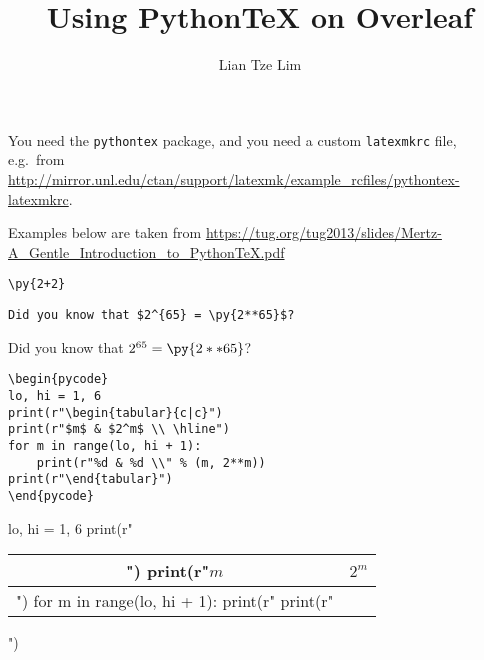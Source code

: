 \documentclass[12pt,a4paper]{scrartcl}
\title{Using PythonTeX on Overleaf}
\author{Lian Tze Lim}
\date{}
\begin{document}
\maketitle

You need the \texttt{pythontex} package, and you need a custom \texttt{latexmkrc} file, e.g.~from \url{http://mirror.unl.edu/ctan/support/latexmk/example_rcfiles/pythontex-latexmkrc}.

Examples below are taken from \url{https://tug.org/tug2013/slides/Mertz-A_Gentle_Introduction_to_PythonTeX.pdf}

\begin{verbatim}
\py{2+2}
\end{verbatim}



\begin{verbatim}
Did you know that $2^{65} = \py{2**65}$?
\end{verbatim}

Did you know that $2^{65} = \py{2**65}$?


\begin{verbatim}
\begin{pycode}
lo, hi = 1, 6
print(r"\begin{tabular}{c|c}")
print(r"$m$ & $2^m$ \\ \hline")
for m in range(lo, hi + 1):
    print(r"%d & %d \\" % (m, 2**m))
print(r"\end{tabular}")
\end{pycode}
\end{verbatim}


\begin{pycode}
lo, hi = 1, 6
print(r"\begin{tabular}{c|c}")
print(r"$m$ & $2^m$ \\ \hline")
for m in range(lo, hi + 1):
    print(r"%
print(r"\end{tabular}")
\end{pycode}
\end{document}
